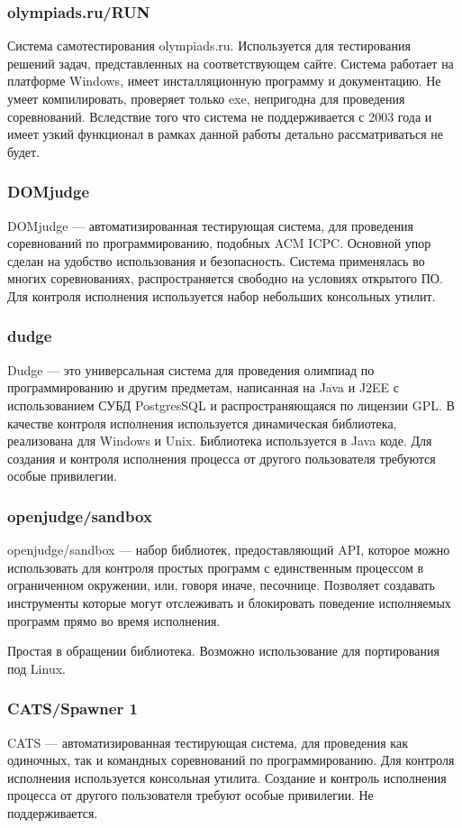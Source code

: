 \documentclass{imcs}
\begin{document}
\subsubsection{olympiads.ru/RUN}
Система самотестирования olympiads.ru\cite{olympiads}. Используется для тестирования решений задач, представленных на соответствующем сайте. Система работает на платформе Windows, имеет инсталляционную программу и документацию. Не умеет компилировать, проверяет только exe, непригодна для проведения соревнований.
Вследствие того что система не поддерживается с 2003 года и имеет узкий функционал в рамках данной работы детально рассматриваться не будет.
\subsubsection{DOMjudge}
DOMjudge\cite{domjudge} --- автоматизированная тестирующая система, для проведения соревнований по программированию, подобных ACM ICPC. Основной упор сделан на удобство использования и безопасность. Система применялась во многих соревнованиях, распространяется свободно на условиях открытого ПО. 
Для контроля исполнения используется набор небольших консольных утилит.
\subsubsection{dudge}
Dudge\cite{dudge} --- это универсальная система для проведения олимпиад по программированию и другим предметам, написанная на Java и J2EE с использованием СУБД PostgresSQL и распространяющаяся по лицензии GPL. 
В качестве контроля исполнения используется динамическая библиотека, реализована для Windows и Unix. Библиотека используется в Java коде. Для создания и контроля исполнения процесса от другого пользователя требуются особые привилегии.%
\subsubsection{openjudge/sandbox}
openjudge/sandbox\cite{openjudge} --- набор библиотек, предоставляющий API, которое можно использовать для контроля простых программ с единственным процессом в ограниченном окружении, или, говоря иначе, песочнице. Позволяет создавать инструменты которые могут отслеживать и блокировать поведение исполняемых программ прямо во время исполнения.

Простая в обращении библиотека. Возможно использование для портирования под Linux.
\subsubsection{CATS/Spawner 1}
CATS\cite{prototype} --- автоматизированная тестирующая система, для проведения как одиночных, так и командных соревнований по программированию.
Для контроля исполнения используется консольная утилита. Создание и контроль исполнения процесса от другого пользователя требуют особые привилегии. Не поддерживается.
\end{document}
